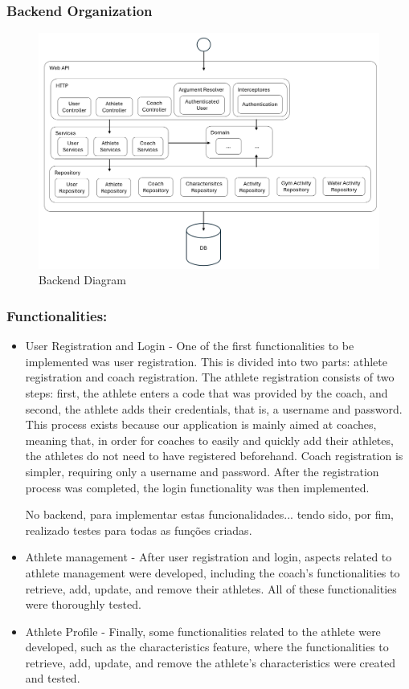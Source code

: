\documentclass[a4paper,twoside,11pt]{article}
\begin{document}
\subsubsection{Backend Organization}
\begin{figure}[H]
\centering
\includegraphics[width=6in]{BackendDiagram.png}
\caption{Backend Diagram}
\end{figure}

\subsubsection{Functionalities:}
\begin{itemize}
\item User Registration and Login - 
One of the first functionalities to be implemented was user registration. This is divided into two parts: athlete registration and coach registration. The athlete registration consists of two steps: first, the athlete enters a code that was provided by the coach, and second, the athlete adds their credentials, that is, a username and password. This process exists because our application is mainly aimed at coaches, meaning that, in order for coaches to easily and quickly add their athletes, the athletes do not need to have registered beforehand. Coach registration is simpler, requiring only a username and password. After the registration process was completed, the login functionality was then implemented.

No backend, para implementar estas funcionalidades... tendo sido, por fim, realizado testes para todas as funções criadas.

\item Athlete management - 
After user registration and login, aspects related to athlete management were developed, including the coach's functionalities to retrieve, add, update, and remove their athletes. All of these functionalities were thoroughly tested.

\item Athlete Profile - 
Finally, some functionalities related to the athlete were developed, such as the characteristics feature, where the functionalities to retrieve, add, update, and remove the athlete's characteristics were created and tested.

\end{itemize}
\end{document}
